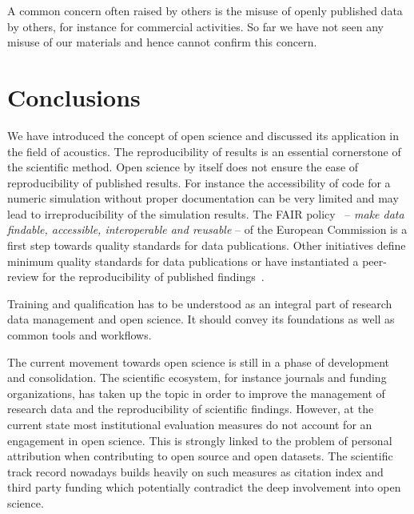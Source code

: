 \documentclass[a4paper, 10pt, twocolumn]{article}
\begin{document}
A common concern often raised by others is the misuse of openly published data by others, 
for instance for commercial activities. So far we have not seen any misuse of our
materials and hence cannot confirm this concern.

\section*{Conclusions} \label{sec:conclusions}

We have introduced the concept of open science and discussed its application in the
field of acoustics. The reproducibility of results is an essential cornerstone of
the scientific method. Open science by itself does not ensure the ease of reproducibility of
published results. For instance the accessibility of code for a numeric simulation without
proper documentation can be very limited and may lead to irreproducibility of the simulation results. 
The FAIR policy~\cite{H2020_FAIR:ERC} -- \emph{make data findable, accessible, interoperable and reusable} -- 
of the European Commission is a first step towards quality standards for 
data publications. Other initiatives define minimum quality standards for data publications 
or have instantiated a peer-review for the reproducibility of published findings~\cite{}.  

Training and qualification has to be understood as an integral part of research data 
management and open science. It should convey its foundations as well as common tools 
and workflows.

The current movement towards open science is still in a phase of development and 
consolidation. The scientific ecosystem, for instance journals and funding organizations, 
has taken up the topic in order to improve the management of research data and the 
reproducibility of scientific findings. However, at the current state most institutional 
evaluation measures do not account for an engagement in open science. This is strongly 
linked to the problem of personal attribution when contributing to open source and open 
datasets. The scientific track record nowadays builds heavily on such measures as 
citation index and third party funding which potentially contradict the deep involvement 
into open science.

{


}
\end{document}
